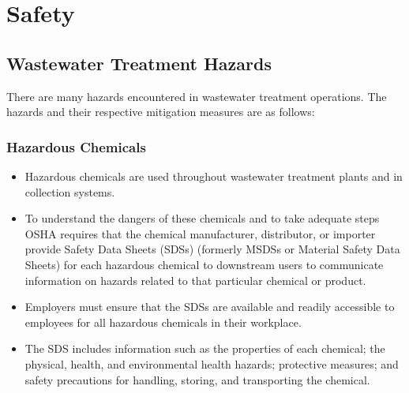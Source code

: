 



\chapter{Safety}
\section{Wastewater Treatment Hazards}
There are many hazards encountered in wastewater treatment operations.  The hazards and their respective mitigation measures are as follows:\\
\subsection{Hazardous Chemicals}
\begin{itemize}
\item Hazardous chemicals are used throughout wastewater treatment plants and in collection systems. 
\item To understand the dangers of these chemicals and to take adequate steps OSHA requires that the chemical manufacturer, distributor, or importer provide Safety Data Sheets (SDSs) (formerly MSDSs or Material Safety Data Sheets) for each hazardous chemical to downstream users to communicate information on hazards related to that particular chemical or product.
\item Employers must ensure that the SDSs are available and readily accessible to employees for all hazardous chemicals in their workplace.
\item The SDS includes information such as the properties of each chemical; the physical, health, and environmental health hazards; protective measures; and safety precautions for handling, storing, and transporting the chemical.\\
\end{itemize}
